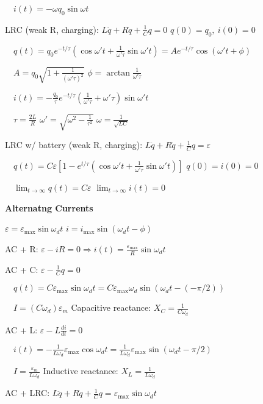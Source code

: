 \documentclass[twocolumn]{article}
\begin{document}
$\quad i(t) = - \omega q_0 \sin \omega t$

LRC (weak R, charging): $L \ddot{q} + R \dot{q} + \frac{1}{C} q = 0$ \hfill $q(0) = q_0,\ i(0) = 0$

$\quad q(t) = q_0 e^{-t/\tau} (\cos \omega' t + \frac{1}{\omega' \tau} \sin \omega' t) = A e^{-t/\tau} \cos(\omega' t + \phi)$

$\quad A = q_0 \sqrt{1 + \frac{1}{(\omega' \tau)^2}}$ \hfill $\phi = \arctan \frac{1}{\omega' \tau}$

$\quad i(t) = -\frac{q_0}{\tau} e^{-t/\tau} \left(\frac{1}{\omega'\tau} + \omega' \tau  \right) \sin \omega' t$

$\quad \tau =\frac{2L}{R}$ \hfill $\omega' = \sqrt{\omega^2 - \frac{1}{\tau^2}}$ \hfill $\omega = \frac{1}{\sqrt{LC}}$

LRC w/ battery (weak R, charging): $L \ddot{q} + R \dot{q} + \frac{1}{C} q = \varepsilon$

$\quad q(t) = C \varepsilon \left[ 1-e^{t/\tau} \left( \cos \omega' t + \frac{1}{\omega' \tau} \sin \omega' t \right) \right]$ \hfill $q(0) = i(0) = 0$

$\quad \lim_{t \to \infty} q(t) = C \varepsilon$ \hfill $\lim_{t \to \infty} i(t) = 0$

\dotfill

\textbf{Alternatng Currents}

$\varepsilon = \varepsilon_{\text{max}} \sin \omega_d t$ \hfill $i = i_{\text{max}} \sin(\omega_d t - \phi)$

AC + R: $\varepsilon - iR = 0 \Longrightarrow i(t) = \frac{\varepsilon_{\text{max}}}{R} \sin \omega_d t$

AC + C: $\varepsilon - \frac{1}{C} q = 0$

$\quad q(t) = C \varepsilon_{\text{max}} \sin \omega_d t = C \varepsilon_{\text{max}} \omega_d \sin( \omega_d t - (-\pi/2))$

$\quad I = (C \omega_d) \varepsilon_{m}$ \hfill Capacitive reactance: $X_C = \frac{1}{C \omega_d}$

AC + L: $\varepsilon - L \frac{di}{dt} = 0$

$\quad i(t) = - \frac{1}{L \omega_d} \varepsilon_{\text{max}} \cos \omega_d t = \frac{1}{L \omega_d} \varepsilon_{\text{max}} \sin(\omega_d t - \pi/2)$

$\quad I = \frac{\varepsilon_m}{L \omega_d}$ \hfill Inductive reactance: $X_L = \frac{1}{L \omega_d}$

\newpage

AC + LRC: $L \ddot{q} + R \dot{q} + \frac{1}{C} q = \varepsilon_{\text{max}} \sin \omega_d t$
\end{document}
